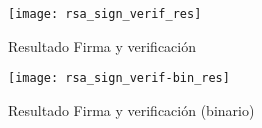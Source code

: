 \documentclass[../main.tex]{subfiles}
\begin{document}
\begin{table*}[]
\begin{tabular}
  \end{tabular}
\end{table*}

\begin{figure}
  \centering
  \texttt{[image: rsa\_sign\_verif\_res]}
  \caption{Resultado Firma y verificación}\label{fig:fyv}
\end{figure}

\begin{figure}
  \centering
  \texttt{[image: rsa\_sign\_verif-bin\_res]}
  \caption{Resultado Firma y verificación (binario)}\label{fig:fyvbin}
\end{figure}
\end{document}

